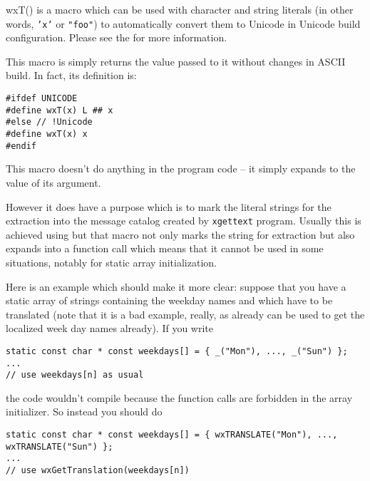 \label{wxt}



wxT() is a macro which can be used with character and string literals (in other
words, {\tt 'x'} or {\tt "foo"}) to automatically convert them to Unicode in
Unicode build configuration. Please see the
 for more information.

This macro is simply returns the value passed to it without changes in ASCII
build. In fact, its definition is:
\begin{verbatim}
#ifdef UNICODE
#define wxT(x) L ## x
#else // !Unicode
#define wxT(x) x
#endif
\end{verbatim}


\label{wxtranslate}


This macro doesn't do anything in the program code -- it simply expands to the
value of its argument.

However it does have a purpose which is to mark the literal strings for the
extraction into the message catalog created by {\tt xgettext} program. Usually
this is achieved using  but that macro not only marks
the string for extraction but also expands into a
 function call which means that it
cannot be used in some situations, notably for static array
initialization.

Here is an example which should make it more clear: suppose that you have a
static array of strings containing the weekday names and which have to be
translated (note that it is a bad example, really, as
 already can be used to get the localized week
day names already). If you write

\begin{verbatim}
static const char * const weekdays[] = { _("Mon"), ..., _("Sun") };
...
// use weekdays[n] as usual
\end{verbatim}

the code wouldn't compile because the function calls are forbidden in the array
initializer. So instead you should do

\begin{verbatim}
static const char * const weekdays[] = { wxTRANSLATE("Mon"), ..., wxTRANSLATE("Sun") };
...
// use wxGetTranslation(weekdays[n])
\end{verbatim}

